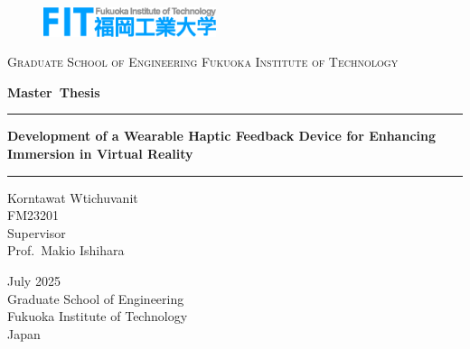 \documentclass[uplatex,
12pt, %
a4paper,
english, %
oneside,
titlepage,
singlespacing, %
liststotoc, %
headsepline,
]{MastersDoctoralThesis} %
\author{Korntawat Witchuvanit} %
\begin{document}
\frontmatter %

\pagestyle{plain} %

\begin{titlepage}
\begin{center}

\begin{figure}[!t]
	\centering
	\includegraphics[width=0.45\textwidth]{Pictures/fit.eps}
	\label{fig:logo}
	\vspace{-0.8cm}
\end{figure}

\textsc{Graduate School of Engineering Fukuoka Institute of Technology} \\


\vspace{1.0cm}
\begin{LARGE}
	
	\textbf{Master~Thesis}
	
	\vspace{+2.cm}
	
	
	\hrule height 2pt
	
	\vspace{+0.5cm}
		\textbf{Development of a Wearable Haptic Feedback Device for Enhancing Immersion in Virtual Reality}

	
	\vspace{+0.5cm}
	
	\hrule height 2pt
	
	\vspace{+3.0cm}
	
	
	
	Korntawat Wtichuvanit\\
	FM23201\\
	\vspace{+3.0cm}
	{\Large{
			Supervisor\\
			Prof.~Makio Ishihara \\
		}
	}
	
	\vspace{+1.5cm}
	

	
	{\Large July 2025  \\\vspace{+1cm}\Large Graduate School of Engineering \\Fukuoka Institute of Technology\\ Japan}
	
\end{LARGE}
\end{center}
\end{titlepage}
\end{document}
